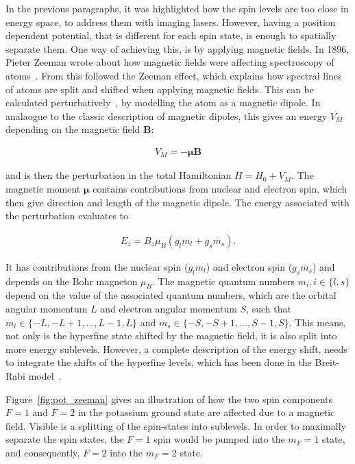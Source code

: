 In the previous paragraphs, it was highlighted how the spin levels are too close in energy space, to address them  with imaging lasers. However, having a position dependent potential, that is different for each spin state, is enough to spatially separate them. One way of achieving this, is by applying magnetic fields. In 1896, Pieter Zeeman wrote about how magnetic fields were affecting spectroscopy of atoms~\cite{Zeeman1896}. From this followed the Zeeman effect, which explains how spectral lines of atoms are split and shifted when applying magnetic fields. This can be calculated perturbatively~\cite{Griffiths2004}, by modelling the atom as a magnetic dipole. In analaogue to the classic description of magnetic dipoles, this gives an energy $V_M$ depending on the magnetic field $\bm{B}$:

\begin{align}
	V_M = - \bm{\mu} \bm{B}
\end{align}

and is then the perturbation in the total Hamiltonian $H = H_0 + V_M$. The magnetic moment $\bm{\mu}$ contains contributions from nuclear and electron spin, which then give direction and length of the magnetic dipole. The energy associated with the perturbation evaluates to

\begin{align}
	E_z = B_z \mu_B \left(g_l m_l + g_s m_s\right).
\end{align}

It has contributions from the nuclear spin ($g_l m_l$) and electron spin ($g_s m_s$) and depends on the Bohr magneton $\mu_B$. The magnetic quantum numbers $m_i, i\in\{l,s\}$ depend on the value of the associated quantum numbers, which are the orbital angular momentum $L$ and electron angular momentum $S$, such that $m_l \in \{-L, -L+1, \ldots, L-1, L\}$ and $m_s \in \{-S, -S+1, \ldots, S-1, S\}$. This means, not only is the hyperfine state shifted by the magnetic field, it is also split into more energy sublevels. However, a complete description of the energy shift, needs to integrate the shifts of the hyperfine levels, which has been done in the Breit-Rabi model~\cite{Breit1931}.

Figure~\ref{fig:pot_zeeman} gives an illustration of how the two spin components $F=1$ and $F=2$ in the potassium ground state are affected due to a magnetic field. Visible is a splitting of the spin-states into sublevels. In order to maximally separate the spin states, the $F=1$ spin would be pumped into the $m_F=1$ state, and consequently, $F=2$ into the $m_F=2$ state.

